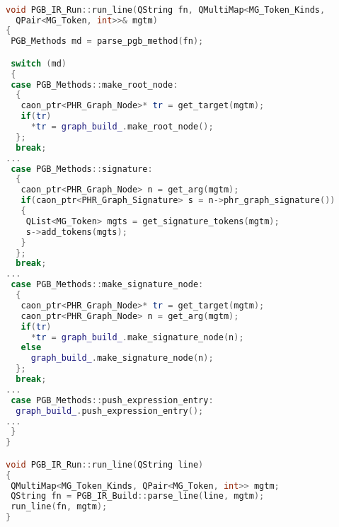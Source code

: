 \begin{lstlisting}[language = C++, numbers = none, 
 caption={Running Hypergraph IR},label={lst:figPGBIR},
    basicstyle = \ttfamily\bfseries\tiny, linewidth = .95\linewidth] 

void PGB_IR_Run::run_line(QString fn, QMultiMap<MG_Token_Kinds, 
  QPair<MG_Token, int>>& mgtm)
{
 PGB_Methods md = parse_pgb_method(fn);

 switch (md)
 {
 case PGB_Methods::make_root_node:
  {
   caon_ptr<PHR_Graph_Node>* tr = get_target(mgtm);
   if(tr)
     *tr = graph_build_.make_root_node();
  };
  break;
...
 case PGB_Methods::signature:
  {
   caon_ptr<PHR_Graph_Node> n = get_arg(mgtm);
   if(caon_ptr<PHR_Graph_Signature> s = n->phr_graph_signature())
   {
    QList<MG_Token> mgts = get_signature_tokens(mgtm);
    s->add_tokens(mgts);
   }
  };
  break;
...
 case PGB_Methods::make_signature_node:
  {
   caon_ptr<PHR_Graph_Node>* tr = get_target(mgtm);
   caon_ptr<PHR_Graph_Node> n = get_arg(mgtm);
   if(tr)
     *tr = graph_build_.make_signature_node(n);
   else
     graph_build_.make_signature_node(n);
  };
  break;
...
 case PGB_Methods::push_expression_entry:
  graph_build_.push_expression_entry();
...
 }
}

void PGB_IR_Run::run_line(QString line)
{
 QMultiMap<MG_Token_Kinds, QPair<MG_Token, int>> mgtm;
 QString fn = PGB_IR_Build::parse_line(line, mgtm);
 run_line(fn, mgtm);
}

\end{lstlisting}
\begin{tikzpicture}[remember picture, overlay, text width=.9\linewidth]

\end{tikzpicture} 
